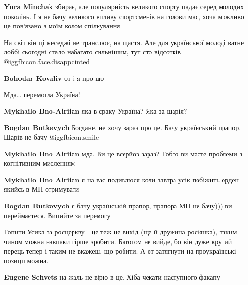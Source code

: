 \begin{itemize}
\begin{itemize}
\textbf{Yura Minchak} збирає, але популярність великого спорту падає серед молодих поколінь. І я не бачу великого впливу спортсменів на голови мас, хоча можливо це пов'язано з моїм колом спілкування

\end{itemize} %

На світ він ці меседжі не транслює, на щастя.
Але для української молоді ватне лоббі сьогодні стало набагато сильнішим, тут сто відсотків  @igg{fbicon.face.disappointed} 

\begin{itemize} %
\textbf{Bohodar Kovaliv} от і я про що
\end{itemize} %

Мда… перемогла Україна!

\begin{itemize} %
\textbf{Mykhailo Bno-Airiian} яка в сраку Україна? Яка за шарія?

\textbf{Bogdan Butkevych} Богдане, не хочу зараз про це. Бачу український прапор. Шарів не бачу  @igg{fbicon.smile} 

\textbf{Mykhailo Bno-Airiian} мда. Ви це всерйоз зараз? Тобто ви маєте проблеми з когнітивним мисленням


\textbf{Mykhailo Bno-Airiian} я на вас подивлюся коли завтра усік побіжить орден якийсь в МП отримувати

\textbf{Bogdan Butkevych} я бачу українській прапор, прапора МП не бачу))) ви переймаєтеся. Випийте за перемогу
\end{itemize} %


Топити Усика за росцеркву - це теж не вихід (ще й дружина росіянка), таким
чином можна навпаки гірше зробити. Батогом не вийде, бо він дуже крутий перець
тепер і таким не вкажеш, що робити. А от затягнути на проукраїнські позиції
можна.

\begin{itemize} %
\textbf{Eugene Schvets} на жаль не вірю в це. Хіба чекати наступного факапу
\end{itemize} %



\end{itemize}
